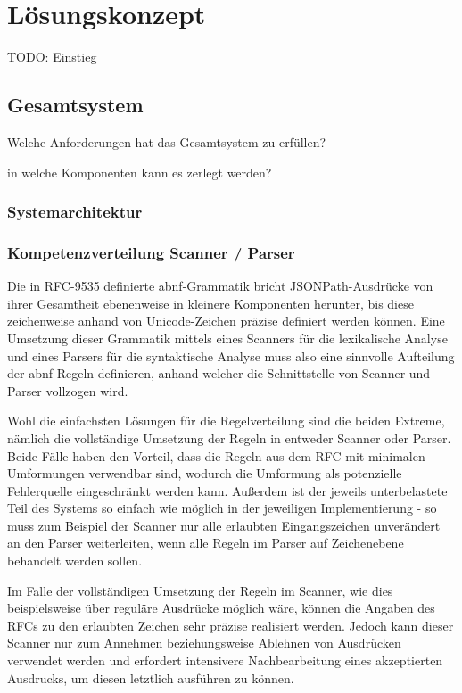 \documentclass[oneside]{ausarbeitung}
\begin{document}
\chapter{Lösungskonzept}
\label{cha:loesungskonzept}

TODO: Einstieg

\section{Gesamtsystem}
Welche Anforderungen hat das Gesamtsystem zu erfüllen?

in welche Komponenten kann es zerlegt werden?
	
	
	
\subsection{Systemarchitektur}
	
	
\subsection{Kompetenzverteilung Scanner / Parser}
	
Die in RFC-9535 definierte \ac{abnf}-Grammatik bricht JSONPath-Ausdrücke von ihrer Gesamtheit ebenenweise in kleinere Komponenten herunter, bis diese zeichenweise anhand von Unicode-Zeichen präzise definiert werden können. Eine Umsetzung dieser Grammatik mittels eines Scanners für die lexikalische Analyse und eines Parsers für die syntaktische Analyse muss also eine sinnvolle Aufteilung der \ac{abnf}-Regeln definieren, anhand welcher die Schnittstelle von Scanner und Parser vollzogen wird.
	
Wohl die einfachsten Lösungen für die Regelverteilung sind die beiden Extreme, nämlich die vollständige Umsetzung der Regeln in entweder Scanner oder Parser. Beide Fälle haben den Vorteil, dass die Regeln aus dem RFC mit minimalen Umformungen verwendbar sind, wodurch die Umformung als potenzielle Fehlerquelle eingeschränkt werden kann. Außerdem ist der jeweils unterbelastete Teil des Systems so einfach wie möglich in der jeweiligen Implementierung - so muss zum Beispiel der Scanner nur alle erlaubten Eingangszeichen unverändert an den Parser weiterleiten, wenn alle Regeln im Parser auf Zeichenebene behandelt werden sollen. 
	
Im Falle der vollständigen Umsetzung der Regeln im Scanner, wie dies beispielsweise über reguläre Ausdrücke möglich wäre, können die Angaben des RFCs zu den erlaubten Zeichen sehr präzise realisiert werden. Jedoch kann dieser Scanner nur zum Annehmen beziehungsweise Ablehnen von Ausdrücken verwendet werden und erfordert intensivere Nachbearbeitung eines akzeptierten Ausdrucks, um diesen letztlich ausführen zu können.
	
\end{document}
